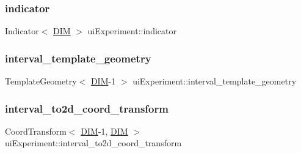 \mbox{\label{classui_experiment_a8400becec774a3accdec7f0e7a102cbd}} 
\subsubsection{\texorpdfstring{indicator}{indicator}}
{\footnotesize\ttfamily Indicator$<$ \mbox{\hyperlink{complex__node___t_h_f_e_m_2uiexp_8h_a589b8b9bfdf714f736059845d568b597}{D\+IM}} $>$ ui\+Experiment\+::indicator\hspace{0.3cm}{\ttfamily [private]}}

\mbox{\label{classui_experiment_a604866b155caa1e05fa9e23f37822885}} 
\subsubsection{\texorpdfstring{interval\+\_\+template\+\_\+geometry}{interval\_template\_geometry}}
{\footnotesize\ttfamily Template\+Geometry$<$ \mbox{\hyperlink{complex__node___t_h_f_e_m_2uiexp_8h_a589b8b9bfdf714f736059845d568b597}{D\+IM}}-\/1 $>$ ui\+Experiment\+::interval\+\_\+template\+\_\+geometry\hspace{0.3cm}{\ttfamily [private]}}

\mbox{\label{classui_experiment_a58e8bc2ca812d734691af34491626d5b}} 
\subsubsection{\texorpdfstring{interval\+\_\+to2d\+\_\+coord\+\_\+transform}{interval\_to2d\_coord\_transform}}
{\footnotesize\ttfamily Coord\+Transform$<$ \mbox{\hyperlink{complex__node___t_h_f_e_m_2uiexp_8h_a589b8b9bfdf714f736059845d568b597}{D\+IM}}-\/1, \mbox{\hyperlink{complex__node___t_h_f_e_m_2uiexp_8h_a589b8b9bfdf714f736059845d568b597}{D\+IM}} $>$ ui\+Experiment\+::interval\+\_\+to2d\+\_\+coord\+\_\+transform\hspace{0.3cm}{\ttfamily [private]}}

